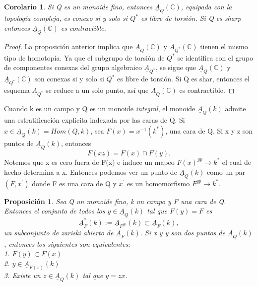 \documentclass[12pt,spanish]{amsart}
\newcommand{\bb}[1]{\mathbb{#1}}
\newtheorem{prop}[Theorem]{Proposición}
\newtheorem{cor}[Theorem]{Corolario}
\theoremstyle{definition}
\theoremstyle{remark}
\begin{document}
\begin{cor}
Si Q es un monoide fino, entonces $\underline{A}_{Q}(\bb{C})$, equipada con la topología compleja, es conexo si y solo si $Q^{\ast}$ es libre de torsión. Si Q es \textit{sharp} entonces $\underline{A}_{Q}(\bb{C})$ es contractible. 
\end{cor}

\begin{proof}
La proposición anterior implica que $\underline{A}_{Q}(\bb{C})$ y $\underline{A}_{Q^{\ast}}(\bb{C})$ tienen el mismo tipo de homotopía. Ya que el subgrupo de torsión de $Q^{\ast}$ se identifica con el grupo de componentes conexas del grupo algebraico $\underline{A}_{Q^{\ast}}$, se sigue que $\underline{A}_{Q}(\bb{C})$ y $\underline{A}_{Q^{\ast}}(\bb{C})$ son conexas si y solo si $Q^{\ast}$ es libre de torsión. Si Q es shar, entonces el esquema $\underline{A}_{Q^{\ast}}$ se reduce a un solo punto, así que $\underline{A}_{Q}(\bb{C})$ es contractible. 
\end{proof}

Cuando k es un campo y Q es un monoide \textit{integral}, el monoide $\underline{A}_{Q}(k)$ admite una estratificación explícita indexada por las caras de Q. Si $x\in \underline{A}_{Q}(k)=Hom(Q,k)$, sea $F(x)=x^{-1}(k^{\ast})$, una cara de Q. Si x y z son puntos de $\underline{A}_{Q}(k)$, entonces
$$F(xz)=F(x) \cap F(y).$$ 
Notemos que x es cero fuera de F(x) e induce un mapeo $F(x)^{gp} \to k^{\ast}$ el cual de hecho determina a x. Entonces podemos ver un punto de $\underline{A}_{Q}(k)$ como un par $(F,x^{\prime})$ donde F es una cara de Q y $x^{\prime}$ es un homomorfismo $F^{gp} \to k^{\ast}$.

\begin{prop}
Sea Q un monoide fino, k un campo y F una cara de Q. Entonces el conjunto de todos los $y\in \underline{A}_{Q}(k)$ tal que $F(y)=F$ es $$\underline{A}_{F}^{\ast}(k):= \underline{A}_{F^{gp}}(k) \subset \underline{A}_{F}(k),$$
un subconjunto de zariski abierto de $\underline{A}_{F}(k)$. Si x y y son dos puntos de $\underline{A}_{Q}(k)$, entonces los siguientes son equivalentes: \\
1. $F(y) \subset F(x)$ \\
2. $y\in \underline{A}_{F(x)}(k)$ \\
3. Existe un $z\in \underline{A}_{Q}(k)$ tal que $y=zx$. 
\end{prop}
\end{document}
